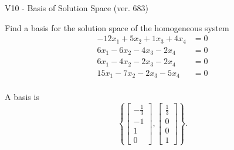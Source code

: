 \begin{exercise}
  \begin{exerciseTitle}V10 - Basis of Solution Space (ver. 683)\end{exerciseTitle}
  \begin{exerciseStatement}
    Find a basis for the solution space of the homogeneous system 
\begin{align*}
 -12 x_ 1 + 5 x_ 2 + 1 x_ 3 + 4 x_ 4 &= 0  \\ 
  6 x_ 1 -6 x_ 2 -4 x_ 3 -2 x_ 4 &= 0  \\ 
  6 x_ 1 -4 x_ 2 -2 x_ 3 -2 x_ 4 &= 0  \\ 
  15 x_ 1 -7 x_ 2 -2 x_ 3 -5 x_ 4 &= 0  \\ 
 \end{align*}


 
  \end{exerciseStatement}

  \begin{exerciseAnswer}
   A basis is   
\[\left\{\left[\begin{array}{c}
-\frac{1}{3} \\
-1 \\
1 \\
0
\end{array}\right] , \left[\begin{array}{c}
\frac{1}{3} \\
0 \\
0 \\
1
\end{array}\right]\right\}.\]

  


  \end{exerciseAnswer}
\end{exercise}
